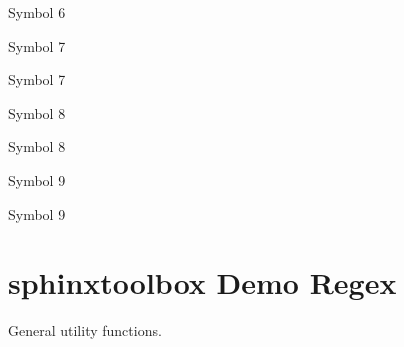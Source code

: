 \documentclass[letterpaper,10pt,english]{sphinxmanual}
\newcommand\thesymbolfootnote{\fnsymbol{footnote}}\let\thenumberfootnote\thefootnote
\begin{document}
\begin{DUlineblock}{0em}
\renewcommand\thefootnote{\thesymbolfootnote}\begin{footnote}[7]\sphinxAtStartFootnote
Symbol 6
%
\end{footnote}\renewcommand\thefootnote{\thenumberfootnote}
\item[] Symbol 7 %
\renewcommand\thefootnote{\thesymbolfootnote}\begin{footnote}[8]\sphinxAtStartFootnote
Symbol 7
%
\end{footnote}\renewcommand\thefootnote{\thenumberfootnote}
\item[] Symbol 8 %
\renewcommand\thefootnote{\thesymbolfootnote}\begin{footnote}[9]\sphinxAtStartFootnote
Symbol 8
%
\end{footnote}\renewcommand\thefootnote{\thenumberfootnote}
\item[] Symbol 9 %
\renewcommand\thefootnote{\thesymbolfootnote}\begin{footnote}[10]\sphinxAtStartFootnote
Symbol 9
%
\end{footnote}\renewcommand\thefootnote{\thenumberfootnote}
\end{DUlineblock}


\vspace{20px}



\chapter{sphinx\sphinxhyphen{}toolbox Demo \sphinxhyphen{} Regex}
\label{\detokenize{regex:module-sphinx_toolbox.utils}}\label{\detokenize{regex:sphinx-toolbox-demo-regex}}\label{\detokenize{regex::doc}}
General utility functions.

\vspace{5px}
\end{document}

